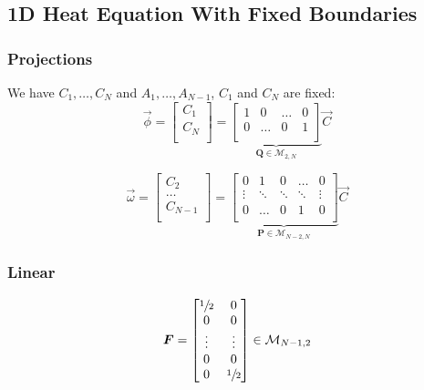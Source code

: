 \documentclass[aps,onecolumn,11pt]{revtex4}
\newcommand{\half}{{\sfrac{1}{2}}}
\newcommand{\mat}[1]{{\bm{#1}}}
\begin{document}
\subsection{1D Heat Equation With Fixed Boundaries}
\subsubsection{Projections}
We have $C_1,\ldots,C_N$ and $A_1,\ldots,A_{N-1}$, $C_1$ and $C_N$ are fixed:
\begin{equation}
	\vec{\phi}=
	\begin{bmatrix}
	C_1\\
	C_N\\
	\end{bmatrix}
	= 
	\underbrace{
	\begin{bmatrix}
	1 & 0 & \ldots & 0\\
 	0 & \ldots & 0 & 1\\
	\end{bmatrix}}_{\mat{Q} \in \mathcal{M}_{2,N}}
	\vec{C}
\end{equation}


\begin{equation}
	\vec{\omega}=
	\begin{bmatrix}
	C_2\\
	\ldots\\
	C_{N-1}\\
	\end{bmatrix}
	= 
	\underbrace{
	\begin{bmatrix}
	0 & 1 & 0 & \ldots & 0 \\
	\vdots & \ddots & \ddots & \ddots & \vdots \\
     0 & \ldots & 0 & 1 & 0\\
 	\end{bmatrix}}_{\mat{P} \in \mathcal{M}_{N-2,N}}
	\vec{C}
\end{equation}

\subsubsection{Linear}

\begin{equation}
	\mat{F} = 
	\begin{bmatrix}
	\half & 0\\
	0     & 0\\
	\vdots & \vdots\\
	0      & 0\\
	0      & \half\\
	\end{bmatrix} \in \mathcal{M}_{N-1,2}
\end{equation}
\end{document}
